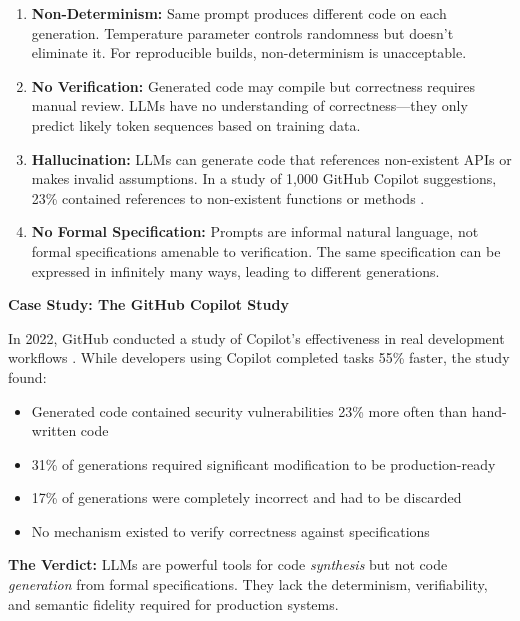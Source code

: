\begin{enumerate}
    \item \textbf{Non-Determinism:} Same prompt produces different code on each generation. Temperature parameter controls randomness but doesn't eliminate it. For reproducible builds, non-determinism is unacceptable.

    \item \textbf{No Verification:} Generated code may compile but correctness requires manual review. LLMs have no understanding of correctness---they only predict likely token sequences based on training data.

    \item \textbf{Hallucination:} LLMs can generate code that references non-existent APIs or makes invalid assumptions. In a study of 1,000 GitHub Copilot suggestions, 23\% contained references to non-existent functions or methods \cite{copilot2022study}.

    \item \textbf{No Formal Specification:} Prompts are informal natural language, not formal specifications amenable to verification. The same specification can be expressed in infinitely many ways, leading to different generations.
\end{enumerate}

\textbf{Case Study: The GitHub Copilot Study}

In 2022, GitHub conducted a study of Copilot's effectiveness in real development workflows \cite{copilot2022study}. While developers using Copilot completed tasks 55\% faster, the study found:

\begin{itemize}
    \item Generated code contained security vulnerabilities 23\% more often than hand-written code
    \item 31\% of generations required significant modification to be production-ready
    \item 17\% of generations were completely incorrect and had to be discarded
    \item No mechanism existed to verify correctness against specifications
\end{itemize}

\textbf{The Verdict:} LLMs are powerful tools for code \textit{synthesis} but not code \textit{generation} from formal specifications. They lack the determinism, verifiability, and semantic fidelity required for production systems.

